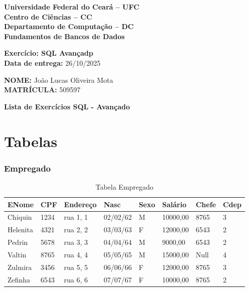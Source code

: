 \documentclass[a4paper,12pt]{article}
\begin{document}
\begin{center}
    \textbf{Universidade Federal do Ceará – UFC}\\
    \textbf{Centro de Ciências – CC}\\
    \textbf{Departamento de Computação – DC}\\
    \textbf{Fundamentos de Bancos de Dados}
\end{center}
\vspace{0.5cm}

\noindent
\textbf{Exercício: SQL Avançadp}\\
\textbf{Data de entrega:} 26/10/2025

\vspace{0.7cm}

\noindent
\textbf{NOME:} João Lucas Oliveira Mota\\
\textbf{MATRÍCULA:} 509597

\vspace{1cm}
\newpage
\begin{center}
    \Large\textbf{Lista de Exercícios SQL - Avançado}
\end{center}

\vspace{0.5cm}

\section*{Tabelas}

\subsubsection*{Empregado}
\begin{table}[h]
\centering
\caption{Tabela Empregado}
\begin{tabular}{|l|l|l|l|l|l|l|l|}
\hline
\textbf{ENome}   & \textbf{CPF} & \textbf{Endereço} & \textbf{Nasc}   & \textbf{Sexo} & \textbf{Salário} & \textbf{Chefe} & \textbf{Cdep} \\ \hline
Chiquin          & 1234         & rua 1, 1          & 02/02/62        & M             & 10000,00       & 8765          & 3            \\ \hline
Helenita         & 4321         & rua 2, 2          & 03/03/63        & F             & 12000,00       & 6543          & 2            \\ \hline
Pedrin           & 5678         & rua 3, 3          & 04/04/64        & M             & 9000,00        & 6543          & 2            \\ \hline
Valtin           & 8765         & rua 4, 4          & 05/05/65        & M             & 15000,00       & Null          & 4            \\ \hline
Zulmira          & 3456         & rua 5, 5          & 06/06/66        & F             & 12000,00       & 8765          & 3            \\ \hline
Zefinha          & 6543         & rua 6, 6          & 07/07/67        & F             & 10000,00       & 8765          & 2            \\ \hline
\end{tabular}
\end{table}
\end{document}
